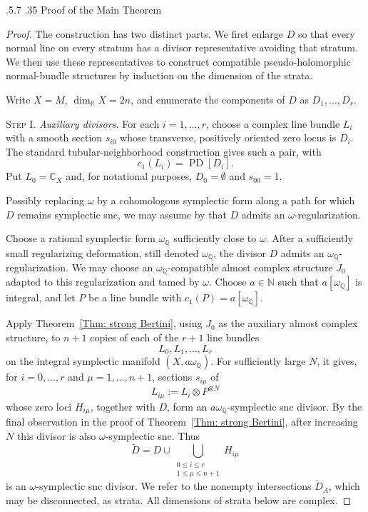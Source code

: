 \documentclass[11pt]{amsart}
\makeatletter
\numberwithin{equation}{section}
\renewcommand{\section}{%
  \@startsection{section}{1}%
    \z@
    {.5\linespacing\@plus.7\linespacing}%
    {.35\linespacing}%
    {\normalfont\bfseries}}
\theoremstyle{plain}
\theoremstyle{definition}
\newcommand{\CC}{\mathbb{C}}
\newcommand{\NN}{\mathbb{N}}
\newcommand{\QQ}{\mathbb{Q}}
\newcommand{\RR}{\mathbb{R}}
\makeatother
\begin{document}

\section{Proof of the Main Theorem}
\label{SS: Proof of existence theorem}

\begin{proof}
The construction has two distinct parts. We first enlarge $D$ so that every
normal line on every stratum has a divisor representative avoiding that
stratum. We then use these representatives to construct compatible
pseudo-holomorphic normal-bundle structures by induction on the dimension
of the strata.

Write $X=M$, $\dim_\RR X=2n$, and enumerate the components of $D$ as
$D_1,\ldots,D_r$.

\medskip
\noindent\textsc{Step I}. \emph{Auxiliary divisors.}
For each $i=1,\ldots,r$, choose a complex line bundle $L_i$ with a smooth
section $s_{i0}$ whose transverse, positively oriented zero locus is $D_i$.
The standard tubular-neighborhood construction gives such a pair, with
\[
c_1(L_i)=\operatorname{PD}[D_i].
\]
Put $L_0=\CC_X$ and, for notational purposes, $D_0=\emptyset$ and $s_{00}=1$.

Possibly replacing $\omega$ by a cohomologous symplectic form along a path for
which $D$ remains symplectic snc, we may assume by \cite[Thm.\,2.13]{TMZ1} that
$D$ admits an $\omega$-regularization.

Choose a rational symplectic form $\omega_\QQ$ sufficiently close to
$\omega$. After a sufficiently small regularizing deformation, still denoted
$\omega_\QQ$, the divisor $D$ admits an $\omega_\QQ$-regularization. We may
choose an $\omega_\QQ$-compatible almost complex structure $J_0$ adapted to
this regularization and tamed by $\omega$. Choose $a\in\NN$ such that
$a[\omega_\QQ]$ is integral, and let $P$ be a line bundle with
$c_1(P)=a[\omega_\QQ]$.

Apply Theorem~\ref{Thm: strong Bertini}, using $J_0$ as the auxiliary almost
complex structure, to $n+1$ copies of each of the $r+1$ line bundles
\[
L_0,L_1,\ldots,L_r
\]
on the integral symplectic manifold $(X,a\omega_\QQ)$. For sufficiently large
$N$, it gives, for $i=0,\ldots,r$ and $\mu=1,\ldots,n+1$, sections
$s_{i\mu}$ of
\[
L_{i\mu}:=L_i\otimes P^{\otimes N}
\]
whose zero loci $H_{i\mu}$, together with $D$, form an $a\omega_\QQ$-symplectic
snc divisor. By the final observation in the proof of Theorem~\ref{Thm: strong
Bertini}, after increasing $N$ this divisor is also $\omega$-symplectic snc.
Thus
\begin{equation}
\label{Eqn: tilde D}
\widetilde D
=
D\cup\bigcup_{\substack{0\le i\le r\\1\le\mu\le n+1}}H_{i\mu}
\end{equation}
is an $\omega$-symplectic snc divisor. We refer to the nonempty intersections
$\widetilde D_A$, which may be disconnected, as strata. All dimensions of strata
below are complex.


\end{proof}
\end{document}
